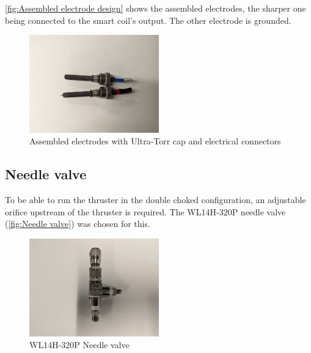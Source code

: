             \autoref{fig:Assembled electrode design} shows the assembled electrodes, the sharper one being connected to the smart coil's output. The other electrode is grounded.

            \begin{figure}[!ht]
                \centering
                \includegraphics[width=0.5\textwidth]{assets/3 design/V2 electrodes.jpg}
                \caption{Assembled electrodes with Ultra-Torr cap and electrical connectors}
                \label{fig:Assembled electrode design}
            \end{figure}

        \subsection{Needle valve}
            
            To be able to run the thruster in the double choked configuration, an adjustable orifice upstream of the thruster is required. The WL14H-320P needle valve (\autoref{fig:Needle valve}) was chosen for this.

            \begin{figure}[!ht]
                \centering
                \includegraphics[width=0.50\textwidth]{assets/3 design/Needle valve.jpg}
                \caption{WL14H-320P Needle valve}
                \label{fig:Needle valve}
            \end{figure}

